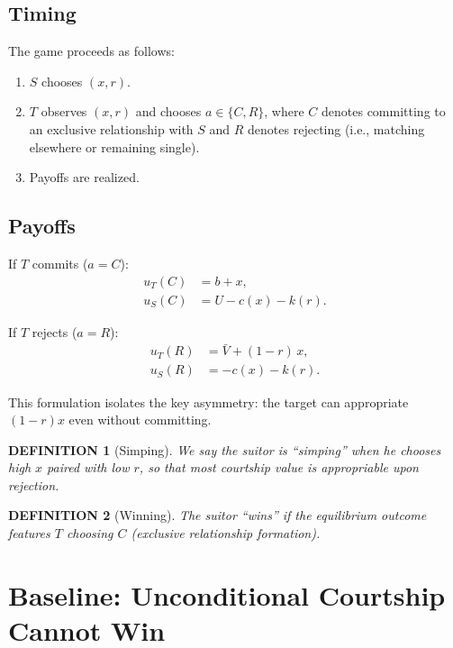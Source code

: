 \documentclass[AER]{AEA}
\newtheorem{definition}{DEFINITION}
\begin{document}
\subsection{Timing}

The game proceeds as follows:

\begin{enumerate}[leftmargin=0.75in]
\item $S$ chooses $(x,r)$.
\item $T$ observes $(x,r)$ and chooses $a \in \{C, R\}$, where $C$ denotes committing to an exclusive relationship with $S$ and $R$ denotes rejecting (i.e., matching elsewhere or remaining single).
\item Payoffs are realized.
\end{enumerate}

\subsection{Payoffs}

If $T$ commits ($a=C$):
\begin{align}
u_T(C) &= b + x, \label{eq:uTC}\\
u_S(C) &= U - c(x) - k(r). \label{eq:uSC}
\end{align}

If $T$ rejects ($a=R$):
\begin{align}
u_T(R) &= \bar{V} + (1-r)\,x, \label{eq:uTR}\\
u_S(R) &= -c(x) - k(r). \label{eq:uSR}
\end{align}

This formulation isolates the key asymmetry: the target can appropriate $(1-r)x$ even without committing.

\begin{definition}[Simping]
We say the suitor is ``simping'' when he chooses high $x$ paired with low $r$, so that most courtship value is appropriable upon rejection.
\end{definition}

\begin{definition}[Winning]
The suitor ``wins'' if the equilibrium outcome features $T$ choosing $C$ (exclusive relationship formation).
\end{definition}

\section{Baseline: Unconditional Courtship Cannot Win}
\end{document}
